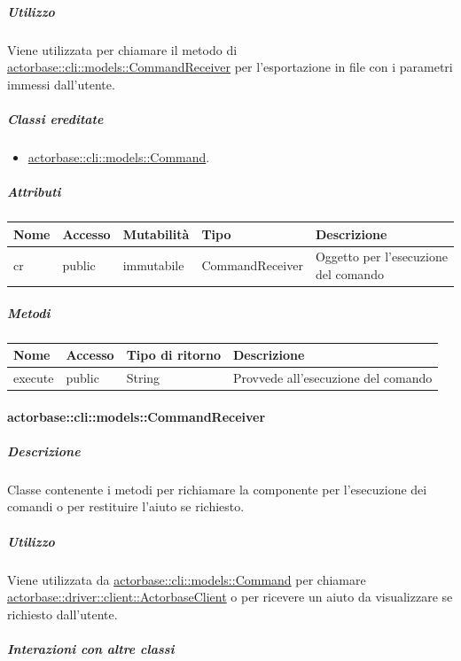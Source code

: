 \documentclass{scalatekids-article}
\begin{document}
\subparagraph{Utilizzo}

Viene utilizzata per chiamare il metodo di
\hyperref[sec:actorbase::cli::models::CommandReceiver]{actorbase::cli::models::CommandReceiver} per l'esportazione in file
 con i parametri immessi dall'utente.

\subparagraph{Classi ereditate}

\begin{itemize}
\item \hyperref[sec:actorbase::cli::models::Command]{actorbase::cli::models::Command}.
\end{itemize}

\subparagraph{Attributi}

\begin{tabular}{| p{1cm} | p{1.5cm} | p{2cm} | p{4cm} | p{8.5cm} |}
  \hline
  Nome & Accesso & Mutabilità & Tipo & Descrizione\\
  \hline
  cr & public & immutabile & CommandReceiver & Oggetto per l'esecuzione del comando\\
  \hline
\end{tabular}

\subparagraph{Metodi}

\begin{tabular}{| l | l | l | l |}
  \hline
  Nome & Accesso & Tipo di ritorno & Descrizione\\
  \hline
  execute & public & String & Provvede all'esecuzione del comando\\
  \hline
\end{tabular}

\paragraph{actorbase::cli::models::CommandReceiver}
\label{sec:actorbase::cli::models::CommandReceiver}

\subparagraph{Descrizione}

Classe contenente i metodi per richiamare la componente  per
l'esecuzione dei comandi o per restituire l'aiuto se richiesto.

\subparagraph{Utilizzo}

Viene utilizzata da \hyperref[sec:actorbase::cli::models::Command]{actorbase::cli::models::Command} per chiamare
\hyperref[sec:actorbase::driver::client::ActorbaseClient]{actorbase::driver::client::ActorbaseClient} o per ricevere un aiuto da
visualizzare se richiesto dall'utente.

\subparagraph{Interazioni con altre classi}
\end{document}
